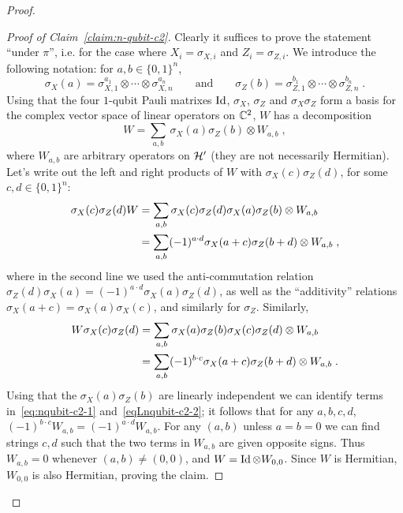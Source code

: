 \begin{proof}
\begin{proof}[Proof of Claim~\ref{claim:n-qubit-c2}]
Clearly it suffices to prove the statement ``under $\pi$'', i.e. for the case where $X_i = \sigma_{X,i}$ and $Z_i = \sigma_{Z,i}$. We introduce the following notation: for $a,b\in\{0,1\}^n$, 
\[\sigma_X(a) = \sigma_{X,1}^{a_1} \otimes \cdots \otimes \sigma_{X,n}^{a_n}\qquad\text{and}\qquad\sigma_Z(b) = \sigma_{Z,1}^{b_1} \otimes \cdots \otimes \sigma_{Z,n}^{b_n}\;.\]
Using that the four $1$-qubit Pauli matrixes $\mathop{\rm Id}\nolimits$, $\sigma_X$, $\sigma_Z$ and $\sigma_X\sigma_Z$ form a basis for the complex vector space of linear operators on $\mathbb{C}^2$, $W$ has a decomposition 
\[ W = \sum_{a,b}\, \sigma_X(a) \sigma_Z(b) \otimes W_{a,b}\;,\]
where $W_{a,b}$ are arbitrary operators on $\mathcal{H}'$ (they are not necessarily Hermitian).
Let's write out the left and right products of $W$ with $\sigma_X(c)\sigma_Z(d)$, for some $c,d\in\{0,1\}^n$:
\begin{align}
 \sigma_X(c)\sigma_Z(d) W &= \sum_{a,b} \sigma_X(c)\sigma_Z(d) \sigma_X(a) \sigma_Z(b) \otimes W_{a,b}\notag\\
&= \sum_{a,b} (-1)^{a\cdot d} \sigma_X(a+c) \sigma_Z(b+d) \otimes W_{a,b}\;,\label{eq:nqubit-c2-1}
\end{align}
where in the second line we used the anti-commutation relation $\sigma_Z(d) \sigma_X(a) =(-1)^{a\cdot d} \sigma_X(a) \sigma_Z(d)$, as well as the ``additivity'' relations $\sigma_X(a+c)=\sigma_X(a)\sigma_X(c)$, and similarly for $\sigma_Z$. Similarly, 
\begin{align}
 W  \sigma_X(c)\sigma_Z(d)&= \sum_{a,b} \sigma_X(a) \sigma_Z(b) \sigma_X(c)\sigma_Z(d) \otimes W_{a,b}\notag\\
&= \sum_{a,b} (-1)^{b\cdot c} \sigma_X(a+c) \sigma_Z(b+d) \otimes W_{a,b}\;.\label{eq:nqubit-c2-2}
\end{align}
 Using that the $ \sigma_X(a) \sigma_Z(b)$ are linearly independent we can identify terms in~\eqref{eq:nqubit-c2-1} and~\eqref{eqLnqubit-c2-2}; it follows that for any $a,b,c,d$, $(-1)^{b\cdot c} W_{a,b} = (-1)^{a \cdot d} W_{a,b}$. For any $(a,b)$ unless $a=b=0$ we can find strings $c,d$ such that the two terms in $W_{a,b}$ are given opposite signs. Thus $W_{a,b}=0$ whenever $(a,b)\neq (0,0)$, and $W = \mathop{\rm Id}\nolimits \otimes W_{0,0}$. Since $W$ is Hermitian, $W_{0,0}$ is also Hermitian, proving the claim. 
\end{proof}

\end{proof}

